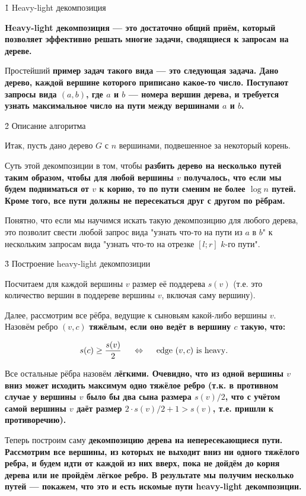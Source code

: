 \h1{ Heavy-light декомпозиция }

\bf{Heavy-light декомпозиция} --- это достаточно общий приём, который позволяет эффективно решать многие задачи, сводящиеся к \bf{запросам на дереве}.

Простейший \bf{пример} задач такого вида --- это следующая задача. Дано дерево, каждой вершине которого приписано какое-то число. Поступают запросы вида $(a,b)$, где $a$ и $b$ --- номера вершин дерева, и требуется узнать максимальное число на пути между вершинами $a$ и $b$.


\h2{ Описание алгоритма }

Итак, пусть дано дерево $G$ с $n$ вершинами, подвешенное за некоторый корень.

Суть этой декомпозиции в том, чтобы \bf{разбить дерево на несколько путей} таким образом, чтобы для любой вершины $v$ получалось, что если мы будем подниматься от $v$ к корню, то по пути сменим не более $\log n$ путей. Кроме того, все пути должны не пересекаться друг с другом по рёбрам.

Понятно, что если мы научимся искать такую декомпозицию для любого дерева, это позволит свести любой запрос вида "узнать что-то на пути из $a$ в $b$" к нескольким запросам вида "узнать что-то на отрезке $[l;r]$ $k$-го пути".


\h3{ Построение heavy-light декомпозиции }

Посчитаем для каждой вершины $v$ размер её поддерева $s(v)$ (т.е. это количество вершин в поддереве вершины $v$, включая саму вершину).

Далее, рассмотрим все рёбра, ведущие к сыновьям какой-либо вершины $v$. Назовём ребро $(v,c)$ \bf{тяжёлым}, если оно ведёт в вершину $c$ такую, что:

$$ s(c) \ge \frac{ s(v) }{ 2 } ~~~~ \Leftrightarrow ~~~~ {\rm edge} ~ (v,c) ~ {\rm is ~ heavy}. $$

Все остальные рёбра назовём \bf{лёгкими}. Очевидно, что из одной вершины $v$ вниз может исходить максимум одно тяжёлое ребро (т.к. в противном случае у вершины $v$ было бы два сына размера $s(v)/2$, что с учётом самой вершины $v$ даёт размер $2 \cdot s(v) / 2 + 1 > s(v)$, т.е. пришли к противоречию).

Теперь построим саму \bf{декомпозицию} дерева на непересекающиеся пути. Рассмотрим все вершины, из которых не выходит вниз ни одного тяжёлого ребра, и будем идти от каждой из них вверх, пока не дойдём до корня дерева или не пройдём лёгкое ребро. В результате мы получим несколько путей --- покажем, что это и есть искомые пути heavy-light декомпозиции.



